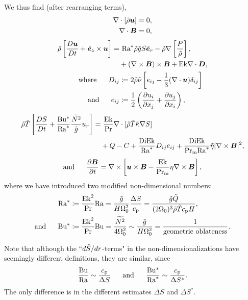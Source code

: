 \documentclass[12pt]{article}
\numberwithin{equation}{section}
\begin{document}
We thus find (after rearranging terms),
\begin{align}
	\nabla\cdot[\tilde{\rho}\bm{u}] &= 0\label{eq:contndrot},\\
	\nabla\cdot \bm{B} &= 0,
\end{align}
\begin{subequations}\label{eq:momndrot}
	\begin{align}
		\rhotilde\left[\matderiv{\vecu} + \ez\times\vecu\right] = &\ \ramod \rhotilde\gtilde S\er         -\rhotilde\nabla\left[ \frac{P}{\rhotilde} \right], \nonumber\\
		&+(\curl\vecb)\times\vecb + \ek \Div\bm{D},\\
		\where D_{ij} &\define 2\rhotilde\nutilde \left[e_{ij} - \frac{1}{3}(\Div\vecu) \delta_{ij} \right]\\
		\andd e_{ij} &\define \frac{1}{2}\left(\pderiv{u_i}{x_j} + \pderiv{u_j}{x_i} \right),
	\end{align}
\end{subequations}
\begin{align}\label{eq:enndrot}
	\tilde{\rho}\tilde{T}\left[ \frac{DS}{Dt}+ \frac{{\rm{Bu^*}}}{{\rm{Ra}}^*} \frac{\tilde{N^2}}{\tilde{g}} u_r\right]  = &\ \frac{{\rm{Ek}}}{{\rm{Pr}}} \nabla\cdot[\tilde{\rho} \tilde{T} \tilde{\kappa} \nabla S] \nonumber \\
	&+  Q-C + \frac{{\rm{Di}}{\rm{Ek}}}{{\rm{Ra}}^*} D_{ij}e_{ij} + \frac{{\rm{Di}}{\rm{Ek}}}{{\rm{Pr_m}}{\rm{Ra}}^*} \tilde{\eta}|\nabla\times\bm{B}|^2,
\end{align}
\begin{align}\label{eq:indndrot}
	\text{and}\ \ \ \ \  \frac{\partial\bm{B}}{\partial t} = \nabla\times\left[\bm{u}\times\bm{B} - \frac{{\rm{Ek}}}{{\rm{Pr_m}}} \eta\nabla\times\bm{B}\right],
\end{align}	
where we have introduced two modified non-dimensional numbers:
\begin{subequations}
	\begin{align}
		{\rm{Ra}}^* &\coloneqq \frac{{\rm{Ek}}^2}{{\rm{Pr}}}{\rm{Ra}} =  \frac{\tilde{g} }{H\Omega_0^2} \frac{\Delta S}{c_{\rm{p}}}=\frac{\tilde{g}\tilde{Q}}{(2\Omega_0)^3\tilde{\rho}\tilde{T}c_{\rm{p}} H},\\ 
		\text{and}\ \ \ \ \  {\rm{Bu^*}} &\coloneqq \frac{{\rm{Ek}}^2}{{\rm{Pr}}}{\rm{Bu}} = \frac{\widetilde{N^2}} {4\Omega_0^2} \sim \frac{\tilde{g} }{H\Omega_0^2} =  \frac{1}{\text{geometric\ oblateness}}.
	\end{align}
\end{subequations}

Note that although the ``$d\tilde{S}/dr$-terms" in the non-dimensionalizations have seemingly different definitions, they are similar, since
\begin{align}
	\frac{{\rm{Bu}}}{{\rm{Ra}}} \sim \frac{c_{\rm{p}}}{\Delta S}\ \ \ \ \  \text{and}\ \ \ \ \  	\frac{{\rm{Bu^*}}}{{\rm{Ra}}^*} \sim \frac{c_{\rm{p}}}{\Delta S^*}.
\end{align}
The only difference is in the different estimates $\Delta S$ and $\Delta S^*$. 
\end{document}
